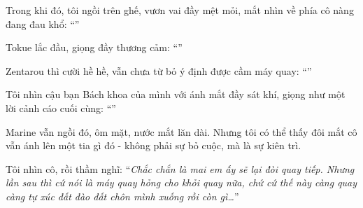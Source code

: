 \documentclass[../main.tex]{subfiles}
\begin{document}
Trong khi đó, tôi ngồi trên ghế, vươn vai đầy mệt mỏi, mắt nhìn về phía cô nàng đang đau khổ: ``''

Tokue lắc đầu, giọng đầy thương cảm: ``''

Zentarou thì cười hề hề, vẫn chưa từ bỏ ý định được cầm máy quay: ``''

Tôi nhìn cậu bạn Bách khoa của mình với ánh mắt đầy sát khí, giọng như một lời cảnh cáo cuối cùng: ``''

Marine vẫn ngồi đó, ôm mặt, nước mắt lăn dài. Nhưng tôi có thể thấy đôi mắt cô vẫn ánh lên một tia gì đó - không phải sự bỏ cuộc, mà là sự kiên trì.

Tôi nhìn cô, rồi thầm nghĩ: ``\textit{Chắc chắn là mai em ấy sẽ lại đòi quay tiếp. Nhưng lần sau thì cứ nói là máy quay hỏng cho khỏi quay nữa, chứ cứ thế này càng quay càng tự xúc đất đào đất chôn mình xuống rồi còn gì\dots}''
\end{document}
